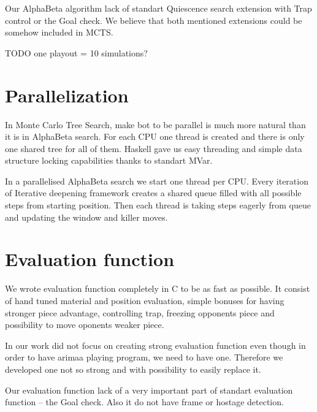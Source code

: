 Our AlphaBeta algorithm lack of standart \ac{Quiescence} search extension with
Trap control or the \ac{Goal check}. We believe that both mentioned extensions
could be somehow included in MCTS.

TODO one playout = 10 simulations?

\section{Parallelization}
In Monte Carlo Tree Search, make bot to be parallel is much more natural than
it is in AlphaBeta search. For each CPU one thread is created and there is only
one shared tree for all of them. Haskell gave us easy threading and simple data
structure locking capabilities thanks to standart MVar.

In a parallelised AlphaBeta search we start one thread per CPU. Every iteration
of Iterative deepening framework creates a shared queue filled with all
possible steps from starting position. Then each thread is taking steps eagerly
from queue and updating the window and killer moves.

\section{Evaluation function}
We wrote evaluation function completely in C to be as fast as possible. It
consist of hand tuned material and position evaluation, simple bonuses for
having stronger piece advantage, controlling trap, freezing opponents piece and
possibility to move oponents weaker piece.

In our work did not focus on creating strong evaluation function even though in
order to have arimaa playing program, we need to have one. Therefore we
developed one not so strong and with possibility to easily replace it.

Our evaluation function lack of a very important part of standart evaluation
function -- the \ac{Goal check}. Also it do not have frame or hostage detection.
